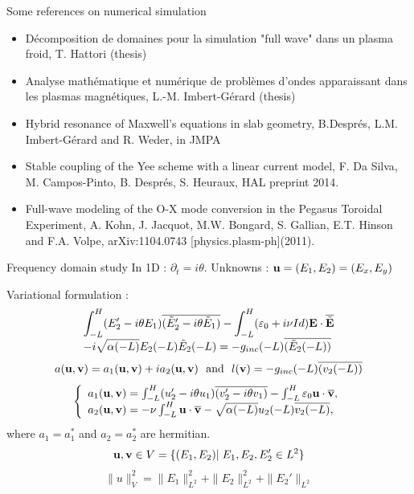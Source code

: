 \begin{frame}{Some references on numerical simulation}
\begin{itemize}
\item Décomposition de domaines pour la simulation "full wave" dans un plasma froid, T. Hattori (thesis) \\ 
\item Analyse mathématique et numérique de problèmes d’ondes apparaissant dans les plasmas
magnétiques, L.-M. Imbert-Gérard (thesis)\\ 
\item Hybrid resonance of Maxwell's equations in slab geometry, B.Després, L.M. Imbert-Gérard and R. Weder, in JMPA\\ 
\item  Stable coupling of the Yee scheme with a linear current model, F. Da Silva, M. Campos-Pinto, B. Després, S. Heuraux, HAL preprint 2014. \\ 
\item Full-wave modeling of the O-X mode conversion in the Pegasus Toroidal Experiment, A. Kohn, J. Jacquot, M.W. Bongard, S. Gallian, E.T. Hinson and F.A. Volpe, arXiv:1104.0743 [physics.plasm-ph](2011).
\end{itemize}
\end{frame}
\begin{frame}{Frequency domain study}
In 1D : $\partial_t = i \theta$. Unknowns : ${\bf u} =(E_1,E_2) = (E_x,E_y)$


\alert{Variational formulation :}
\[
\begin{array}{l}
\displaystyle \int_{-L}^H (E_2' -i\theta E_1)\overline{(\tilde E_2' -i \theta \tilde E_1)} - \int_{-L}^H ({\bf \varepsilon}_0 +i\nu Id) {\bf E} \cdot \overline{\tilde {{\bf E}}}
\\ \displaystyle  - i \sqrt{\alpha(-L)} E_2 (-L) \tilde E_2 (-L) = -g_{inc} (-L) \overline{( \tilde E_2(-L) )} 
\end{array}
\]
\[
a({\bf u},{\bf v}) = a_1 ({\bf u},{\bf v}) +i a_2({\bf u},{\bf v})\  \text{ and } \  l({\bf v}) = -g_{inc} (-L) \overline{(v_2(-L) )} 
\]
\[
\left\{\begin{array}{l}
a_1({\bf u},{\bf v}) = \int_{-L}^H (u_2' -i\theta u_1)\overline{(v_2' -i \theta v_1)} - \int_{-L}^H {\bf \varepsilon}_0 {\bf u}\cdot \overline{{\bf v}}, 
\\ a_2({\bf u},{\bf v}) = -\nu \int_{-L}^H  {\bf u}\cdot \overline{{\bf v}} -  \sqrt{\alpha(-L)} u_2 (-L) \overline{v_2 (-L)} , 
\end{array}\right.
\]
where $a_1= a_1^*$ and $a_2=a_2^*$ are hermitian.
\[
{\bf u},{\bf v} \in V =  \{ (E_1,E_2) |\; E_1,E_2,E_2'  \in L^2\}
\]
\[
\|u\|_{V}^2 = \|E_1\|^2_{L^2} + \|E_2\|^2_{L^2} + \|E_2'\|_{L^2}
\]
\end{frame}
